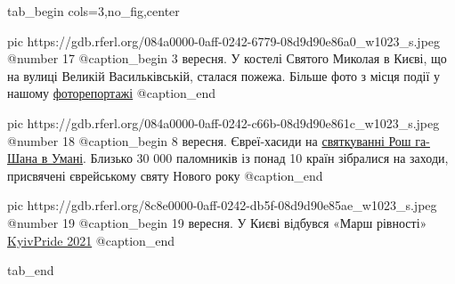  
 
 
 
 


\ifcmt
  tab_begin cols=3,no_fig,center

     pic https://gdb.rferl.org/084a0000-0aff-0242-6779-08d9d90e86a0_w1023_s.jpeg
		 @number 17
		 @caption_begin
3 вересня. У костелі Святого Миколая в Києві, що на вулиці Великій Васильківській, сталася пожежа. Більше фото з місця події у нашому \href{https://www.radiosvoboda.org/a/u-kosteli-svyatogo-mykolaya-v-kyevi-stalasya-pozhezha/31442759.html}{фоторепортажі}
		 @caption_end

		 pic https://gdb.rferl.org/084a0000-0aff-0242-c66b-08d9d90e861c_w1023_s.jpeg
		 @number 18
		 @caption_begin
8 вересня. Євреї-хасиди на \href{https://www.radiosvoboda.org/a/photo-khasydy-uman-rosh-ha-shana/31450399.html}{святкуванні Рош га-Шана в Умані}. Близько 30 000 паломників із понад 10 країн зібралися на заходи, присвячені єврейському святу Нового року
		 @caption_end

		 pic https://gdb.rferl.org/8c8e0000-0aff-0242-db5f-08d9d90e85ae_w1023_s.jpeg
		 @number 19
		 @caption_begin
		   19 вересня. У Києві відбувся «Марш рівності» \href{https://www.radiosvoboda.org/a/fotogalereya-kyiv-pride-marsh-rivnosti/31467813.html}{KyivPride 2021}
		 @caption_end

  tab_end
\fi
